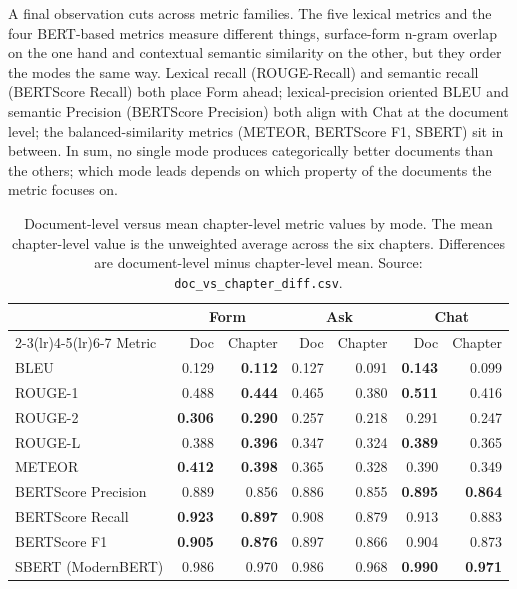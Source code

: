 \sloppy
A final observation cuts across metric families. The five lexical
metrics and the four BERT-based metrics measure different things,
surface-form n-gram overlap on the one hand and contextual
semantic similarity on the other, but they order the modes the
same way. Lexical recall (ROUGE-Recall) and semantic recall
(BERTScore Recall) both place Form ahead; lexical-precision
oriented BLEU and semantic Precision (BERTScore Precision) both
align with Chat at the document level; the balanced-similarity
metrics (METEOR, BERTScore F1, SBERT) sit in between. In sum,
no single mode produces categorically better documents than the
others; which mode leads depends on which property of the
documents the metric focuses on.
\fussy

\begin{table}[htbp]
\centering
\caption{Document-level versus mean chapter-level metric values by
mode. The mean chapter-level value is the unweighted average across
the six chapters. Differences are document-level minus chapter-level
mean. Source: \texttt{doc\_vs\_chapter\_diff.csv}.}
\label{tab:doc-vs-chapter}
\small
\begin{tabular}{@{}l r r r r r r@{}}
\toprule
& \multicolumn{2}{c}{Form} & \multicolumn{2}{c}{Ask} & \multicolumn{2}{c}{Chat} \\
\cmidrule(lr){2-3}\cmidrule(lr){4-5}\cmidrule(lr){6-7}
Metric & Doc & Chapter & Doc & Chapter & Doc & Chapter \\
\midrule
BLEU                & 0.129 & \textbf{0.112} & 0.127 & 0.091 & \textbf{0.143} & 0.099 \\
ROUGE-1             & 0.488 & \textbf{0.444} & 0.465 & 0.380 & \textbf{0.511} & 0.416 \\
ROUGE-2             & \textbf{0.306} & \textbf{0.290} & 0.257 & 0.218 & 0.291 & 0.247 \\
ROUGE-L             & 0.388 & \textbf{0.396} & 0.347 & 0.324 & \textbf{0.389} & 0.365 \\
METEOR              & \textbf{0.412} & \textbf{0.398} & 0.365 & 0.328 & 0.390 & 0.349 \\
BERTScore Precision & 0.889 & 0.856 & 0.886 & 0.855 & \textbf{0.895} & \textbf{0.864} \\
BERTScore Recall    & \textbf{0.923} & \textbf{0.897} & 0.908 & 0.879 & 0.913 & 0.883 \\
BERTScore F1        & \textbf{0.905} & \textbf{0.876} & 0.897 & 0.866 & 0.904 & 0.873 \\
SBERT (ModernBERT)  & 0.986 & 0.970 & 0.986 & 0.968 & \textbf{0.990} & \textbf{0.971} \\
\bottomrule
\end{tabular}
\end{table}
